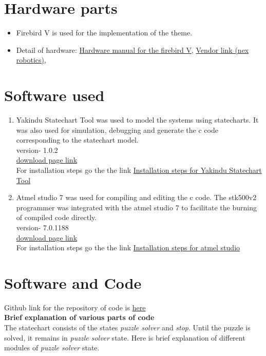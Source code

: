 \documentclass[a4paper,12pt,oneside]{book}
\begin{document}
\section{Hardware parts}
\begin{itemize}
  \item Firebird V is used for the implementation of the theme. 
  \item Detail of hardware: \href{./datasheet/Fire Bird V ATMEGA2560 Hardware Manual 2010-12-21.pdf}{Hardware manual for the firebird V}, \href{http://www.nex-robotics.com/products/fire-bird-v-robots/fire-bird-v-atmega2560-robotic-research-platform.html}{Vendor link (nex robotics)},
\end{itemize}

\section{Software used}
\begin{enumerate}
  \item  Yakindu Statechart Tool was used to model the systems using statecharts. It was also used for simulation, debugging and generate the c code corresponding to the statechart model.
   \\
version-  1.0.2
\\
\href{https://info.itemis.com/state-machine/download-yakindu-statechart-tools}{download page link}
\\
For installation steps go the the link \href{https://www.itemis.com/en/yakindu/state-machine/documentation/installation/}{Installation steps for Yakindu Statechart Tool}

 \item Atmel studio 7 was used for compiling and editing the c code. The stk500v2 programmer was integrated with the atmel studio 7 to facilitate the burning of compiled code directly. 
   \\
   version- 7.0.1188 
   \\
   \href{http://www.atmel.com/tools/atmelstudio.aspx#download}{download page link}
   \\
 For installation steps go the the link \href{https://www.youtube.com/watch?v=q8ruiOJhNbk}{Installation steps for atmel studio}
 
  
  
\end{enumerate}



\section{Software and Code}
Github link for the repository of code is \href{https://github.com/eYSIP-2017/Statechart-Based-Modeling-of-Robotic-Themes}{here}
\\
\textbf{Brief explanation of various parts of code }
\\
The statechart consists of the states \textit{puzzle solver} and \textit{stop}. Until the puzzle is solved, it remains in \emph{puzzle solver} state. Here is brief explanation of different modules of \textit{puzzle solver} state.
 
\end{document}
